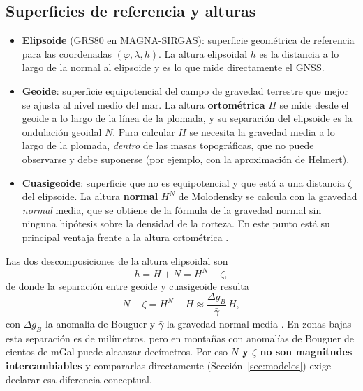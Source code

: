 \documentclass[11pt,letterpaper]{article}
\begin{document}
\subsection{Superficies de referencia y alturas}
\label{sec:alturas}
\begin{itemize}
    \item \textbf{Elipsoide} (GRS80 en MAGNA-SIRGAS): superficie geométrica de referencia
    para las coordenadas $(\varphi,\lambda,h)$. La altura elipsoidal $h$ es la distancia a
    lo largo de la normal al elipsoide y es lo que mide directamente el GNSS.
    \item \textbf{Geoide}: superficie equipotencial del campo de gravedad terrestre que mejor se
    ajusta al nivel medio del mar. La altura \textbf{ortométrica} $H$ se mide desde el
    geoide a lo largo de la línea de la plomada, y su separación del elipsoide es la
    ondulación geoidal $N$. Para calcular $H$ se necesita la gravedad media a lo largo de la plomada,
    \emph{dentro} de las masas topográficas, que no puede observarse y debe suponerse
    (por ejemplo, con la aproximación de Helmert).
    \item \textbf{Cuasigeoide}: superficie que no es equipotencial y que está a una
    distancia $\zeta$ del elipsoide. La altura \textbf{normal} $H^N$ de Molodensky se calcula
    con la gravedad \emph{normal} media, que se obtiene de la fórmula de la gravedad normal sin
    ninguna hipótesis sobre la densidad de la corteza. En este punto está su principal ventaja
    frente a la altura ortométrica \citep{hofmannmoritz2006}.
\end{itemize}

Las dos descomposiciones de la altura elipsoidal son
\begin{equation}
h = H + N = H^N + \zeta,
\label{eq:alturas}
\end{equation}
de donde la separación entre geoide y cuasigeoide resulta
\begin{equation}
N-\zeta = H^N - H \approx \frac{\Delta g_B}{\bar{\gamma}}\,H,
\label{eq:nzeta}
\end{equation}
con $\Delta g_B$ la anomalía de Bouguer y $\bar\gamma$ la gravedad normal media
\citep{hofmannmoritz2006}. En zonas bajas esta separación es de milímetros, pero en
montañas con anomalías de Bouguer de cientos de mGal puede alcanzar decímetros. Por eso
\textbf{$N$ y $\zeta$ no son magnitudes intercambiables} y compararlas directamente
(Sección~\ref{sec:modelos}) exige declarar esa diferencia conceptual.
\end{document}
